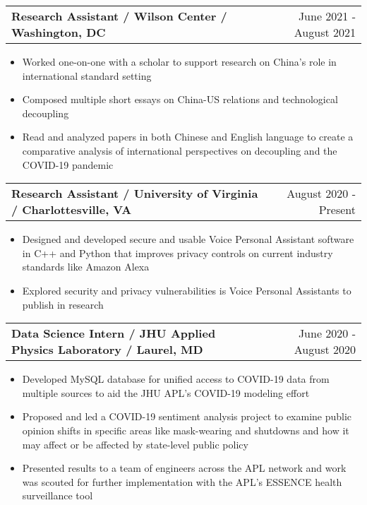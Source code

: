 \documentclass[letterpaper,11pt]{article}
\makeatletter
\newcommand{\resumeItem}[1]{
  \item\small{
    {#1} \vspace{-2pt}
  }
}
\newcommand{\resumeSubheadingTwo}[2]{
  \vspace{-1pt}\item
    \begin{tabular*}{0.97\textwidth}{l@{\extracolsep{\fill}}r}
      \textbf{#1} & #2 \\
    \end{tabular*}\vspace{-5pt}
}
\newcommand{\resumeItemListStart}{\begin{itemize}}
\newcommand{\resumeItemListEnd}{\end{itemize}\vspace{-5pt}}
\makeatother
\begin{document}
    \resumeSubheadingTwo
      {Research Assistant / Wilson Center / Washington, DC}{June 2021 - August 2021}
      \resumeItemListStart
        \resumeItem{Worked one-on-one with a scholar to support research on China's role in international standard setting}
        \resumeItem{Composed multiple short essays on China-US relations and technological decoupling}
        \resumeItem{Read and analyzed papers in both Chinese and English language to create a comparative analysis of international perspectives on decoupling and the COVID-19 pandemic}
      \resumeItemListEnd

    \resumeSubheadingTwo
      {Research Assistant / University of Virginia / Charlottesville, VA}{August 2020 - Present}
      \resumeItemListStart
        \resumeItem{Designed and developed secure and usable Voice Personal Assistant software in C++ and Python that improves privacy controls on current industry standards like Amazon Alexa}
        \resumeItem{Explored security and privacy vulnerabilities is Voice Personal Assistants to publish in research}
      \resumeItemListEnd

    \resumeSubheadingTwo
      {Data Science Intern / JHU Applied Physics Laboratory / Laurel, MD}{June 2020 - August 2020}
      \resumeItemListStart
        \resumeItem{Developed MySQL database for unified access to COVID-19 data from multiple sources to aid the JHU APL's COVID-19 modeling effort}
        \resumeItem{Proposed and led a COVID-19 sentiment analysis project to examine public opinion shifts in specific areas like mask-wearing and shutdowns and how it may affect or be affected by state-level public policy}
        \resumeItem{Presented results to a team of engineers across the APL network and work was scouted for further implementation with the APL's ESSENCE health surveillance tool}
      \resumeItemListEnd
      

      
\end{document}
